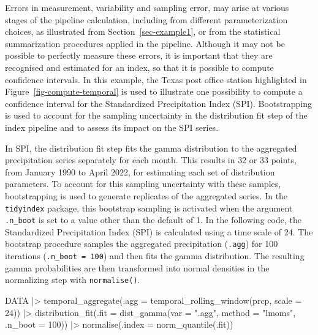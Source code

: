 \documentclass[
]{interact}
\newenvironment{Shaded}{\begin{snugshade}}{\end{snugshade}}
\newcommand{\AttributeTok}[1]{\textcolor[rgb]{0.40,0.45,0.13}{#1}}
\newcommand{\DecValTok}[1]{\textcolor[rgb]{0.68,0.00,0.00}{#1}}
\newcommand{\FunctionTok}[1]{\textcolor[rgb]{0.28,0.35,0.67}{#1}}
\newcommand{\NormalTok}[1]{\textcolor[rgb]{0.00,0.23,0.31}{#1}}
\newcommand{\SpecialCharTok}[1]{\textcolor[rgb]{0.37,0.37,0.37}{#1}}
\newcommand{\StringTok}[1]{\textcolor[rgb]{0.13,0.47,0.30}{#1}}
\begin{document}
Errors in measurement, variability and sampling error, may arise at
various stages of the pipeline calculation, including from different
parameterization choices, as illustrated from
Section~\ref{sec-example1}, or from the statistical summarization
procedures applied in the pipeline. Although it may not be possible to
perfectly measure these errors, it is important that they are recognised
and estimated for an index, so that it is possible to compute confidence
intervals. In this example, the Texas post office station highlighted in
Figure~\ref{fig-compute-temporal} is used to illustrate one possibility
to compute a confidence interval for the Standardized Precipitation
Index (SPI). Bootstrapping is used to account for the sampling
uncertainty in the distribution fit step of the index pipeline and to
assess its impact on the SPI series.

In SPI, the distribution fit step fits the gamma distribution to the
aggregated precipitation series separately for each month. This results
in 32 or 33 points, from January 1990 to April 2022, for estimating each
set of distribution parameters. To account for this sampling uncertainty
with these samples, bootstrapping is used to generate replicates of the
aggregated series. In the \texttt{tidyindex} package, this bootstrap
sampling is activated when the argument \texttt{.n\_boot} is set to a
value other than the default of 1. In the following code, the
Standardized Precipitation Index (SPI) is calculated using a time scale
of 24. The bootstrap procedure samples the aggregated precipitation
(\texttt{.agg}) for 100 iterations (\texttt{.n\_boot\ =\ 100}) and then
fits the gamma distribution. The resulting gamma probabilities are then
transformed into normal densities in the normalizing step with
\texttt{normalise()}.

\begin{Shaded}
\begin{Highlighting}[]
\NormalTok{DATA }\SpecialCharTok{|\textgreater{}} 
  \FunctionTok{temporal\_aggregate}\NormalTok{(}\AttributeTok{.agg =} \FunctionTok{temporal\_rolling\_window}\NormalTok{(prcp, }\AttributeTok{scale =} \DecValTok{24}\NormalTok{)) }\SpecialCharTok{|\textgreater{}} 
  \FunctionTok{distribution\_fit}\NormalTok{(}\AttributeTok{.fit =} \FunctionTok{dist\_gamma}\NormalTok{(}\AttributeTok{var =} \StringTok{".agg"}\NormalTok{, }\AttributeTok{method =} \StringTok{"lmoms"}\NormalTok{,}
                                     \AttributeTok{.n\_boot =} \DecValTok{100}\NormalTok{)) }\SpecialCharTok{|\textgreater{}}
  \FunctionTok{normalise}\NormalTok{(}\AttributeTok{.index =} \FunctionTok{norm\_quantile}\NormalTok{(.fit))}
\end{Highlighting}
\end{Shaded}
\end{document}
